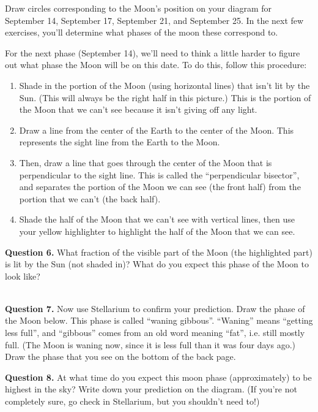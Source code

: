 \documentclass[11pt]{article}
\begin{document}
Draw circles corresponding to the Moon's position on your diagram for September 14, September 17, September 21, and September 25. In the next few exercises, you'll determine what phases of the moon these correspond to.

\newpage

For the next phase (September 14), we'll need to think a little harder to figure out what phase the Moon will be on this date. 
To do this, follow this procedure:

\begin{enumerate}
	\item Shade in the portion of the Moon (using horizontal lines) that isn't lit by the Sun. (This will always be the right half in this picture.) This is the portion of the Moon that we can't see because it isn't giving off any light.
	\item Draw a line from the center of the Earth to the center of the Moon. This represents the sight line from the Earth to the Moon.
	\item Then, draw a line that goes through the center of the Moon that is perpendicular to the sight line. This is called the ``perpendicular bisector'', and separates the portion of the Moon we can see (the front half) from the portion that we can't (the back half).
	\item Shade the half of the Moon that we can't see with vertical lines, then use your yellow highlighter to highlight the half of the Moon that we can see.
\end{enumerate}

\textbf{Question 6.} What fraction of the visible part of the Moon (the highlighted part) is lit by the Sun (not shaded in)? What do you expect this phase of the Moon to look like?


\vspace*{1.5cm}

\hrulefill\\

\textbf{Question 7.} Now use Stellarium to confirm your prediction. Draw the phase of the Moon below. This phase is called ``waning gibbous''. ``Waning'' means ``getting less full'', and ``gibbous'' comes from an old word meaning ``fat'', i.e. still mostly full. (The Moon is waning now, since it is less full than it was four days ago.)
Draw the phase that you see on the bottom of the back page.


\textbf{Question 8.} At what time do you expect this moon phase (approximately) to be highest in the sky? Write down your prediction on the diagram. (If you're not completely sure, go check in Stellarium, but you shouldn't need to!)
\end{document}
